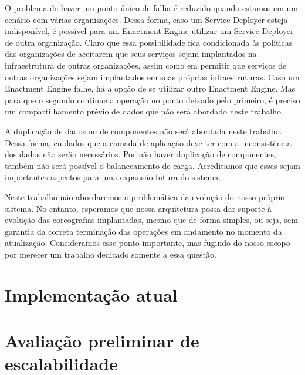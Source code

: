 O problema de haver um ponto único de falha é reduzido quando estamos em um cenário com várias organizações. Dessa forma, caso um Service Deployer esteja indisponível, é possível para um Enactment Engine utilizar um Service Deployer de outra organização. Claro que essa possibilidade fica condicionada às políticas das organizações de aceitarem que seus serviços sejam implantados na infraestrutura de outras organizações, assim como em permitir que serviços de outras organizações sejam implantados em suas próprias infraestruturas. Caso um Enactment Engine falhe, há a opção de se utilizar outro Enactment Engine. Mas para que o segundo continue a operação no ponto deixado pelo primeiro, é preciso um compartilhamento prévio de dados que não será abordado neste trabalho. 

A duplicação de dados ou de componentes não será abordada neste trabalho. Dessa forma, cuidados que a camada de aplicação deve ter com a inconsistência dos dados não serão necessários. Por não haver duplicação de componentes, também não será possível o balanceamento de carga. Acreditamos que esses sejam importantes aspectos para uma expansão futura do sistema.

Neste trabalho não abordaremos a problemática da evolução do nosso próprio sistema. No entanto, esperamos que nossa arquitetura possa dar suporte à evolução das coreografias implantadas, mesmo que de forma simples, ou seja, sem garantia da correta terminação das operações em andamento no momento da atualização. Consideramos esse ponto importante, mas fugindo do nosso escopo por merecer um trabalho dedicado somente a essa questão.

\section{Implementação atual}
\label{sec:impl_atual}

\section{Avaliação preliminar de escalabilidade}
\label{sec:avaliacao}



